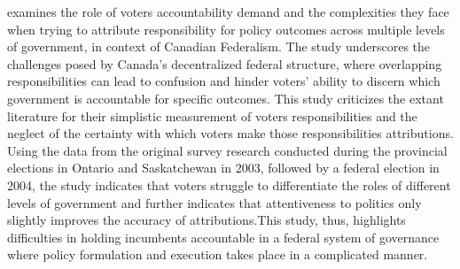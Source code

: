  examines the role of voters accountability demand and the complexities they face when trying to attribute responsibility for policy outcomes across multiple levels of government, in context of Canadian Federalism. The study underscores the challenges posed by Canada's decentralized federal structure, where overlapping responsibilities can lead to confusion and hinder voters' ability to discern which government is accountable for specific outcomes. This study criticizes the extant literature for their simplistic measurement of voters responsibilities and the neglect of the certainty with which voters make those responsibilities attributions. Using the data from the original survey research conducted during the provincial elections in Ontario and Saskatchewan in 2003, followed by a federal election in 2004, the study indicates that voters struggle to differentiate the roles of different levels of government and further indicates that attentiveness to politics only slightly improves the accuracy of attributions.This study, thus, highlights difficulties in holding incumbents accountable in a federal system of governance where policy formulation and execution takes place in a complicated manner. \par
